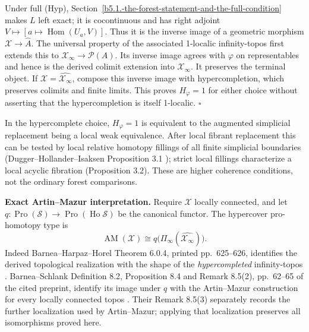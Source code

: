 \documentclass[11pt,a4paper]{article}
\theoremstyle{definition}
\begin{document}
Under full (Hyp), Section~\ref{b5.1.-the-forest-statement-and-the-full-condition} makes \(L\) left exact; it is cocontinuous and
has right adjoint \(V\mapsto[a\mapsto\operatorname{Hom}(U_a,V)]\). Thus
it is the inverse image of a geometric morphism
\(\mathcal X\to\widehat A\). The universal property of the associated
1-localic infinity-topos
\cite[Proposition~6.4.5.7]{HTT} first extends this to
\(\mathcal X_\infty\to\mathcal P(A)\). Its inverse image agrees with
\(\varphi\) on representables and hence is the derived colimit extension
into \(\mathcal X_\infty\). It preserves the terminal object. If
\(\mathscr X=\widehat{\mathcal X_\infty}\), compose this inverse image
with hypercompletion, which preserves colimits and finite limits. This
proves \(H_\varphi=1\) for either choice without asserting that the
hypercompletion is itself 1-localic. \(\square\)

In the hypercomplete choice, \(H_\varphi=1\) is equivalent to the
augmented simplicial replacement being a local weak equivalence. After
local fibrant replacement this can be tested by local relative homotopy
fillings of all finite simplicial boundaries (Dugger--Hollander--Isaksen
Proposition 3.1 \cite[Propositions 3.1--3.2]{DHI}); strict local
fillings characterize a local acyclic fibration (Proposition 3.2). These
are higher coherence conditions, not the ordinary forest comparisons.

\textbf{Exact Artin--Mazur interpretation.} Require \(\mathcal X\)
locally connected, and let
\(q:\operatorname{Pro}(\mathcal S)\to
\operatorname{Pro}(\operatorname{Ho}\mathcal S)\) be the canonical
functor. The hypercover pro-homotopy type is
\[
\operatorname{AM}(\mathcal X)\cong
q\bigl(\Pi_\infty(\widehat{\mathcal X_\infty})\bigr).
\tag{HS3}
\]
Indeed Barnea--Harpaz--Horel Theorem 6.0.4, printed pp.~625--626,
identifies the derived topological realization with the shape of the
\emph{hypercompleted} infinity-topos \cite{BHH}.
Barnea--Schlank Definition 8.2, Proposition 8.4 and Remark 8.5(2),
pp.~62--65 of the cited preprint, identify its image under
\(q\) with the Artin--Mazur construction for every locally connected
topos \cite{BS}. Their Remark 8.5(3) separately records
the further localization used by Artin--Mazur; applying that localization
preserves all isomorphisms proved here.
\end{document}

